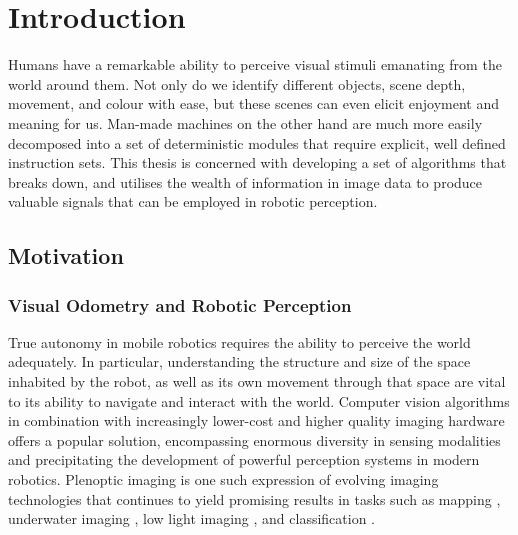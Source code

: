 
\chapter{Introduction}


    


Humans have a remarkable ability to perceive visual stimuli emanating from the world around them. Not only do we identify different objects, scene depth, movement, and colour with ease, but these scenes can even elicit enjoyment and meaning for us. Man-made machines on the other hand are much more easily decomposed into a set of deterministic modules that require explicit, well defined instruction sets. This thesis is concerned with developing a set of algorithms that breaks down, and utilises the wealth of information in image data to produce valuable signals that can be employed in robotic perception. 


\section{Motivation}
\subsection{Visual Odometry and Robotic Perception}
True  autonomy in mobile robotics requires the ability to perceive the world adequately. In particular, understanding the structure and size of the space inhabited by the robot, as well as its own movement through that space are vital to its ability to navigate and interact with the world. Computer vision algorithms in combination with increasingly lower-cost and higher quality imaging hardware offers a popular solution, encompassing enormous diversity in sensing modalities and precipitating the development of powerful perception systems in modern robotics. Plenoptic imaging is one such expression of evolving imaging technologies that continues to yield promising results in tasks such as mapping \cite{kuehefuss2016rgbdslam}, underwater imaging \cite{skinner2016underwaterplenoptic}, low light imaging \cite{dansereau2015volumetric}, and classification \cite{wang2016lfcnn}.

